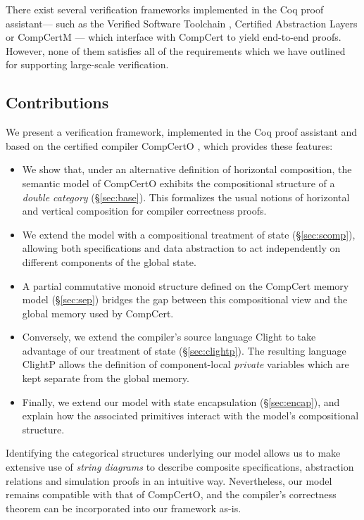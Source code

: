 \documentclass[acmsmall,screen,review,anonymous]{acmart}
\begin{document}
There exist several verification frameworks
implemented in the Coq proof assistant---%
such as the Verified Software Toolchain \cite{vst}, Certified Abstraction Layers \cite{popl15} or
CompCertM \cite{compcertm}---%
which interface with CompCert to yield end-to-end proofs.
However,
none of them satisfies all of
the requirements which we have outlined
for supporting large-scale verification.


\subsection{Contributions} %

We present a verification framework,
implemented in the Coq proof assistant
and based on the certified compiler CompCertO \cite{compcerto},
which provides these features:
\begin{itemize}
  \item We show that,
    under an alternative definition of horizontal composition,
    the semantic model of CompCertO
    exhibits the compositional structure of a \emph{double category}
    (\S\ref{sec:base}).
    This formalizes 
    the usual notions of horizontal and vertical composition
    for compiler correctness proofs.
  \item We extend the model
    with a compositional treatment of state (\S\ref{sec:scomp}),
    allowing both specifications and data abstraction
    to act independently on different components of the global state.
  \item 
    A partial commutative monoid structure
    defined on the CompCert memory model (\S\ref{sec:sep})
    bridges the gap between this compositional view
    and the global memory used by CompCert.
  \item
    Conversely,
    we extend the compiler's source language Clight
    to take advantage of our treatment of state (\S\ref{sec:clightp}).
    The resulting language ClightP allows the definition of
    component-local \emph{private} variables
    which are kept separate from the global memory.
  \item
    Finally,
    we extend our model with state encapsulation (\S\ref{sec:encap}),
    and explain how the associated primitives
    interact with the model's compositional structure.
\end{itemize}
Identifying the categorical structures underlying our model
allows us to make extensive use of \emph{string diagrams} \cite{dcsd}
to describe composite specifications, abstraction relations and simulation proofs
in an intuitive way.
Nevertheless, our model remains compatible with that of CompCertO, and
the compiler's correctness theorem
can be incorporated into our framework as-is.
\end{document}
